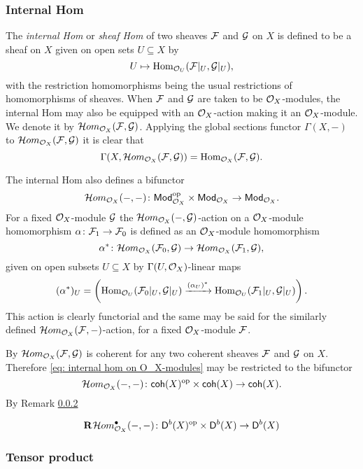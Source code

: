 \subsubsection{Internal Hom}
\label{Subsubsection: Internal Hom}

The \emph{internal Hom} or \emph{sheaf Hom} of two sheaves $\mathcal F$ and $\mathcal G$ on $X$ is defined to be a sheaf on $X$ given on open sets $U \subseteq X$ by
\[
    U \mapsto \operatorname{Hom}_{{\mathcal{O}_{U}}}(\mathcal F|_U, \mathcal G|_U),
\]
with the restriction homomorphisms being the usual restrictions of homomorphisms of sheaves. When $\mathcal F$ and $\mathcal G$ are taken to be ${\mathcal{O}_{X}}$-modules, the internal Hom may also be equipped with an ${\mathcal{O}_{X}}$-action making it an ${\mathcal{O}_{X}}$-module. We denote it by $\localhom_{\struct{X}}(\F, \G)$. Applying the global sections functor $\Gamma(X, -)$ to $\localhom_{\struct{X}}(\F, \G)$ it is clear that
\[
    \Gamma(X, \localhom_{\struct{X}}(\F, \G)) = \Hom_{\struct{X}}(\F, \G).
\]

The internal Hom also defines a bifunctor
\begin{equation}
    \label{eq: internal hom on O_X-modules}
    \localhom_{\struct{X}}(-, -) \colon \mod{\struct{X}}^\op \times \mod{\struct{X}} \to \mod{\struct{X}}.
\end{equation}
For a fixed ${\mathcal{O}_{X}}$-module $\mathcal G$ the $\localhom_{\struct{X}}(-, \G)$-action on a ${\mathcal{O}_{X}}$-module homomorphism $\alpha \colon \mathcal F_1 \to \mathcal F_0$ is defined as an ${\mathcal{O}_{X}}$-module homomorphism
\[
    \alpha^* \colon \localhom_{\struct{X}}(\F_0, \G) \to \localhom_{\struct{X}}(\F_1, \G),
\]
given on open subsets $U \subseteq X$ by $\Gamma(U, {\mathcal{O}_{X}})$-linear maps
\[
    (\alpha^*)_U = \left(\operatorname{Hom}_{{\mathcal{O}_{U}}}(\mathcal F_0|_U, \mathcal G|_U) \xrightarrow{(\alpha_U)^*} \operatorname{Hom}_{{\mathcal{O}_{U}}}(\mathcal F_1|_U, \mathcal G|_U)\right).
\]
This action is clearly functorial and the same may be said for the similarly defined $\localhom_{\struct{X}}(\F, -)$-action, for a fixed ${\mathcal{O}_{X}}$-module $\mathcal F$.

By \cite[EGA II, \S 9, Proposition 9.1.1]{EGA} $\localhom_{\struct{X}}(\F, \G)$ is coherent for any two coherent sheaves $\mathcal F$ and $\mathcal G$ on $X$. Therefore \eqref{eq: internal hom on O_X-modules} may be restricted to the bifunctor
\[
    \localhom[X](-, -) \colon \coherent{X}^\op \times \coherent{X} \to \coherent{X}.
\]
By Remark \ref{} 


\[
    \rderived{}{\localhom[X]^\bullet(-, -)} \colon \derb{X}^\op \times \derb{X} \to \derb{X}
\]

\subsubsection{Tensor product }

